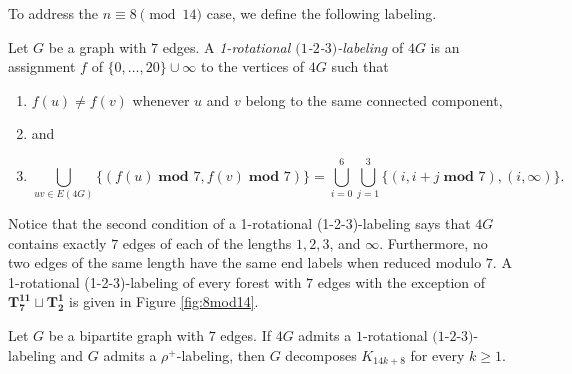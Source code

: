 To address the $n \equiv 8 \pmod{14}$ case, we define the following labeling.
\begin{definition}\label{def:1-2-3-1-rot}
    Let $G$ be a graph with $7$ edges. A \emph{1-rotational $(1$-$2$-$3)$-labeling} of $4G$ is an assignment $f$ of $\{0,\dots,20\} \cup \infty$ to the vertices of $4G$ such that
    \begin{enumerate}
        \item $f(u) \neq f(v)$ whenever $u$ and $v$ belong to the same connected component, 
        \item[] and
        \item  $$ \bigcup_{uv\in E(4G)} \{(f(u)\; \textbf{mod } 7,f(v)\; \textbf{mod } 7)\}= \bigcup_{i=0}^{6} \bigcup_{j=1}^{3} \{(i,i+j \; \textbf{mod } 7), (i,\infty)\}.$$
    \end{enumerate}
\end{definition}
Notice that the second condition of a 1-rotational (1-2-3)-labeling says that $4G$ contains exactly $7$ edges of each of the lengths $1,2,3$, and $\infty$. Furthermore, no two edges of the same length have the same end labels when reduced modulo $7.$ A 1-rotational (1-2-3)-labeling of every forest with $7$ edges with the exception of $\mathbf{T_{7}^{11}}\sqcup\mathbf{T_{2}^{1}}$ is given in Figure \ref{fig:8mod14}. 

\begin{thm}\label{thm:1-2-3 1-rot plus rho}
    Let $G$ be a bipartite graph with $7$ edges. If $4G$ admits a $1$-rotational  $(1$-$2$-$3)$-labeling and $G$ admits a $\rho^{+}$-labeling, then $G$ decomposes $K_{14k+8}$ for every $k\geq1.$
\end{thm}

